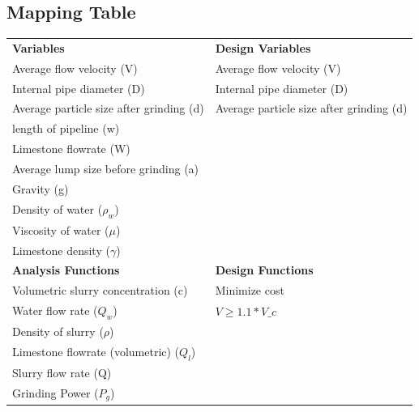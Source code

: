 \documentclass{article}
\begin{document}
\subsection{Mapping Table}
\begin{center}
	\begin{tabular}{|l|l|}
		\hline
		\textbf{Variables}                       & \textbf{Design Variables}                \\
		Average flow velocity (V)                & Average flow velocity (V)                \\
		Internal pipe diameter (D)               & Internal pipe diameter (D)               \\
		Average particle size after grinding (d) & Average particle size after grinding (d) \\
		length of pipeline (w)                   &                                          \\
		Limestone flowrate (W)                   &                                          \\
		Average lump size before grinding (a)    &                                          \\
		Gravity (g)                              &                                          \\
		Density of water ($\rho_w$)              &                                          \\
		Viscosity of water ($\mu$)               &                                          \\
		Limestone density ($\gamma$)             &                                          \\
		\hline
		\textbf{Analysis Functions}              & \textbf{Design Functions}                \\
		Volumetric slurry concentration (c)      & Minimize cost                            \\
		Water flow rate ($Q_w$)                  & $V \geq 1.1 * V\_c  $                    \\
		Density of slurry ($\rho$)               &                                          \\
		Limestone flowrate (volumetric) ($Q_l$)  &                                          \\
		Slurry flow rate (Q)                     &                                          \\
		Grinding Power ($P_g$)                   &                                          \\

\end{tabular}
\end{center}
\end{document}
